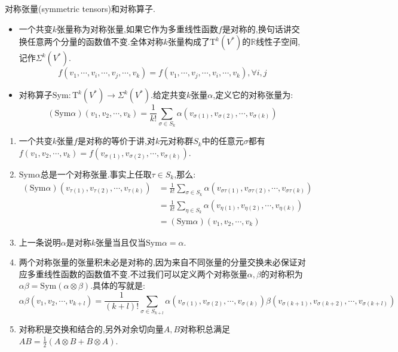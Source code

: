 对称张量(symmetric tensors)和对称算子.
\begin{itemize}
	\item 一个共变$k$张量称为对称张量,如果它作为多重线性函数$f$是对称的,换句话讲交换任意两个分量的函数值不变.全体对称$k$张量构成了$\mathrm{T}^k(V^*)$的$\mathbb{R}$线性子空间,记作$\Sigma^k(V^*)$.
	$$f(v_1,\cdots,v_i,\cdots,v_j,\cdots,v_k)=f(v_1,\cdots,v_j,\cdots,v_i,\cdots,v_k),\forall i,j$$
	\item 对称算子$\mathrm{Sym}:\mathrm{T}^k(V^*)\to\Sigma^k(V^*)$.给定共变$k$张量$\alpha$,定义它的对称张量为:
	$$(\mathrm{Sym}\alpha)(v_1,v_2,\cdots,v_k)=\frac{1}{k!}\sum_{\sigma\in S_k}\alpha(v_{\sigma(1)},v_{\sigma(2)},\cdots,v_{\sigma(k)})$$
\end{itemize}
\begin{enumerate}
	\item 一个共变$k$张量$f$是对称的等价于讲,对$k$元对称群$S_k$中的任意元$\sigma$都有$f(v_1,v_2,\cdots,v_k)=f(v_{\sigma(1)},v_{\sigma(2)},\cdots,v_{\sigma(k)})$.
	\item $\mathrm{Sym}\alpha$总是一个对称张量.事实上任取$\tau\in S_k$,那么:
	\begin{align*}
	(\mathrm{Sym}\alpha)(v_{\tau(1)},v_{\tau(2)},\cdots,v_{\tau(k)})&=\frac{1}{k!}\sum_{\sigma\in S_k}\alpha(v_{\sigma\tau(1)},v_{\sigma\tau(2)},\cdots,v_{\sigma\tau(k)})\\&=\frac{1}{k!}\sum_{\eta\in S_k}\alpha(v_{\eta(1)},v_{\eta(2)},\cdots,v_{\eta(k)})\\&=(\mathrm{Sym}\alpha)(v_1,v_2,\cdots,v_k)
	\end{align*}
	\item 上一条说明$\alpha$是对称$k$张量当且仅当$\mathrm{Sym}\alpha=\alpha$.
	\item 两个对称张量的张量积未必是对称的,因为来自不同张量的分量交换未必保证对应多重线性函数的函数值不变.不过我们可以定义两个对称张量$\alpha,\beta$的对称积为$\alpha\beta=\mathrm{Sym}(\alpha\otimes\beta)$.具体的写就是:
	$$\alpha\beta(v_1,v_2,\cdots,v_{k+l})=\frac{1}{(k+l)!}\sum_{\sigma\in S_{k+l}}\alpha(v_{\sigma(1)},v_{\sigma(2)},\cdots,v_{\sigma(k)})\beta(v_{\sigma(k+1)},v_{\sigma(k+2)},\cdots,v_{\sigma(k+l)})$$
	\item 对称积是交换和结合的,另外对余切向量$A,B$对称积总满足$AB=\frac{1}{2}(A\otimes B+B\otimes A)$.
\end{enumerate}


